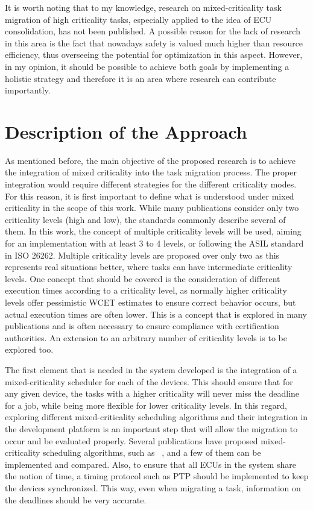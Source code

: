 It is worth noting that to my knowledge, research on mixed-criticality task migration of high criticality tasks, especially applied to the idea of ECU consolidation, has not been published. A possible reason for the lack of research in this area is the fact that nowadays safety is valued much higher than resource efficiency, thus overseeing the potential for optimization in this aspect. However, in my opinion, it should be possible to achieve both goals by implementing a holistic strategy and therefore it is an area where research can contribute importantly.

\section*{Description of the Approach}\label{section:descriptionapproach}

As mentioned before, the main objective of the proposed research is to achieve the integration of mixed criticality into the task migration process. The proper integration would require different strategies for the different criticality modes. For this reason, it is first important to define what is understood under mixed criticality in the scope of this work. While many publications consider only two criticality levels (high and low), the standards commonly describe several of them. In this work, the concept of multiple criticality levels will be used, aiming for an implementation with at least 3 to 4 levels, or following the ASIL standard in ISO 26262. Multiple criticality levels are proposed over only two as this represents real situations better, where tasks can have intermediate criticality levels. One concept that should be covered is the consideration of different execution times according to a criticality level, as normally higher criticality levels offer pessimistic WCET estimates to ensure correct behavior occurs, but actual execution times are often lower. This is a concept that is explored in many publications and is often necessary to ensure compliance with certification authorities. An extension to an arbitrary number of criticality levels is to be explored too. 

The first element that is needed in the system developed is the integration of a mixed-criticality scheduler for each of the devices. This should ensure that for any given device, the tasks with a higher criticality will never miss the deadline for a job, while being more flexible for lower criticality levels. In this regard, exploring different mixed-criticality scheduling algorithms and their integration in the development platform is an important step that will allow the migration to occur and be evaluated properly. Several publications have proposed mixed-criticality scheduling algorithms, such as ~\parencite{baruah1, fleming1, zhao1, baruah2, lili1}, and a few of them can be implemented and compared. Also, to ensure that all ECUs in the system share the notion of time, a timing protocol such as PTP should be implemented to keep the devices synchronized. This way, even when migrating a task, information on the deadlines should be very accurate.

